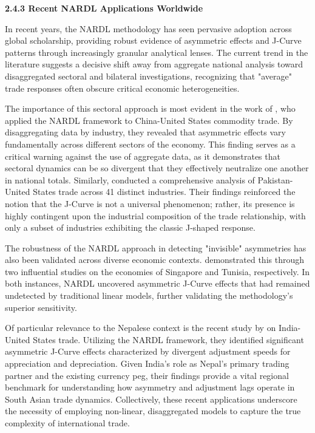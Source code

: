 \documentclass[12pt]{article}
\begin{document}
\vspace{0.5cm}
\noindent\textbf{2.4.3 Recent NARDL Applications Worldwide}

In recent years, the NARDL methodology has seen pervasive adoption across global scholarship, providing robust evidence of asymmetric effects and J-Curve patterns through increasingly granular analytical lenses. The current trend in the literature suggests a decisive shift away from aggregate national analysis toward disaggregated sectoral and bilateral investigations, recognizing that "average" trade responses often obscure critical economic heterogeneities.

The importance of this sectoral approach is most evident in the work of \textcite{Bahmani-Oskooee2019-ha}, who applied the NARDL framework to China-United States commodity trade. By disaggregating data by industry, they revealed that asymmetric effects vary fundamentally across different sectors of the economy. This finding serves as a critical warning against the use of aggregate data, as it demonstrates that sectoral dynamics can be so divergent that they effectively neutralize one another in national totals. Similarly, \textcite{Bahmani-Oskooee2020-nv} conducted a comprehensive analysis of Pakistan-United States trade across 41 distinct industries. Their findings reinforced the notion that the J-Curve is not a universal phenomenon; rather, its presence is highly contingent upon the industrial composition of the trade relationship, with only a subset of industries exhibiting the classic J-shaped response.

The robustness of the NARDL approach in detecting "invisible" asymmetries has also been validated across diverse economic contexts. \textcite{Bahmani-Oskooee2017-cf} demonstrated this through two influential studies on the economies of Singapore and Tunisia, respectively. In both instances, NARDL uncovered asymmetric J-Curve effects that had remained undetected by traditional linear models, further validating the methodology's superior sensitivity.

Of particular relevance to the Nepalese context is the recent study by \textcite{Ganai2025-bv} on India-United States trade. Utilizing the NARDL framework, they identified significant asymmetric J-Curve effects characterized by divergent adjustment speeds for appreciation and depreciation. Given India's role as Nepal's primary trading partner and the existing currency peg, their findings provide a vital regional benchmark for understanding how asymmetry and adjustment lags operate in South Asian trade dynamics. Collectively, these recent applications underscore the necessity of employing non-linear, disaggregated models to capture the true complexity of international trade.
\end{document}
